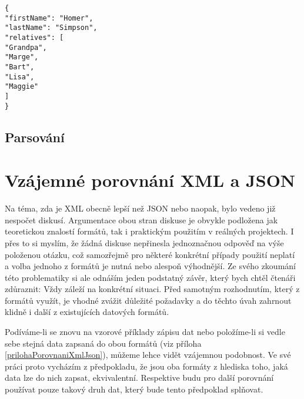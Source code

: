 \texttt{\small\{\\
\hspace*{2mm}"firstName": "Homer",\\
\hspace*{2mm}"lastName": "Simpson",\\
\hspace*{2mm}"relatives": [\\
\hspace*{4mm}"Grandpa",\\
\hspace*{4mm}"Marge",\\
\hspace*{4mm}"Bart",\\
\hspace*{4mm}"Lisa",\\
\hspace*{4mm}"Maggie"\\
\hspace*{2mm}]\\
\} }

\subsection{Parsování}

\section{Vzájemné porovnání XML a JSON}


Na téma, zda je XML obecně lepší než JSON nebo naopak, bylo vedeno již nespočet diskusí. Argumentace obou stran diskuse je obvykle podložena jak teoretickou znalostí formátů, tak i praktickým použitím v reálných projektech. I přes to si myslím, že žádná diskuse nepřinesla jednoznačnou odpověď na výše položenou otázku, což samozřejmě pro některé konkrétní případy použití neplatí a volba jednoho z formátů je nutná nebo alespoň výhodnější. Ze svého zkoumání této problematiky si ale odnáším jeden podstatný závěr, který bych chtěl čtenáři zdůraznit: Vždy záleží na konkrétní situaci. Před samotným rozhodnutím, který z formátů využít, je vhodné zvážit důležité požadavky a do těchto úvah zahrnout klidně i další z existujících datových formátů.

Podíváme-li se znovu na vzorové příklady zápisu dat nebo položíme-li si vedle sebe stejná data zapsaná do obou formátů (viz příloha \ref{prilohaPorovnaniXmlJson}), můžeme lehce vidět vzájemnou podobnost. Ve své práci proto vycházím z předpokladu, že jsou oba formáty z hlediska toho, jaká data lze do nich zapsat, ekvivalentní. Respektive budu pro další porovnání používat pouze takový druh dat, který bude tento předpoklad splňovat.